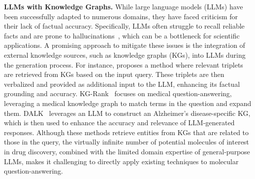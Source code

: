 \noindent \textbf{LLMs with Knowledge Graphs.}
While large language models (LLMs) have been successfully adapted to numerous domains, they have faced criticism for their lack of factual accuracy. Specifically, LLMs often struggle to recall reliable facts and are prone to hallucinations~\cite{ji2023survey}, which can be a bottleneck for scientific applications.
A promising approach to mitigate these issues is the integration of external knowledge sources, such as knowledge graphs (KGs), into LLMs during the generation process. 
For instance, \citet{baek2023knowledge} proposes a method where relevant triplets are retrieved from KGs based on the input query. These triplets are then verbalized and provided as additional input to the LLM, enhancing its factual grounding and accuracy.
KG-Rank~\cite{yang2024kg} focuses on medical question-answering, leveraging a medical knowledge graph to match terms in the question and expand them. DALK~\cite{li2024dalk} leverages an LLM to construct an Alzheimer's disease-specific KG, which is then used to enhance the accuracy and relevance of LLM-generated responses.
Although these methods retrieve entities from KGs that are related to those in the query, the virtually infinite number of potential molecules of interest in drug discovery, combined with the limited domain expertise of general-purpose LLMs, makes it challenging to directly apply existing techniques to molecular question-answering.